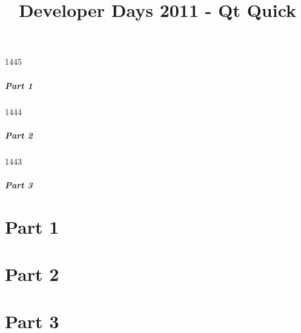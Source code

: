 \documentclass[t]{beamer}
\title{Developer Days 2011 - Qt Quick}
\begin{document}


\begin{slide}{1445}
  \frametitle{Part 1}
  \tableofcontents[part=1]
\end{slide}

\begin{slide}{1444}
  \frametitle{Part 2}
  \tableofcontents[part=2]
\end{slide}

\begin{slide}{1443}
  \frametitle{Part 3}
  \tableofcontents[part=3]
\end{slide}

\part{Part 1}




\part{Part 2}




\part{Part 3}




\end{document}
